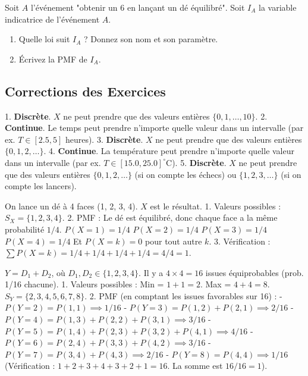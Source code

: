 \begin{exercicebox}
Soit $A$ l'événement "obtenir un 6 en lançant un dé équilibré".
Soit $I_A$ la variable indicatrice de l'événement $A$.
\begin{enumerate}
    \item Quelle loi suit $I_A$ ? Donnez son nom et son paramètre.
    \item Écrivez la PMF de $I_A$.
\end{enumerate}
\end{exercicebox}

\subsection{Corrections des Exercices}


\begin{correctionbox}
1.  \textbf{Discrète}. $X$ ne peut prendre que des valeurs entières $\{0, 1, \dots, 10\}$.
2.  \textbf{Continue}. Le temps peut prendre n'importe quelle valeur dans un intervalle (par ex. $T \in [2.5, 5]$ heures).
3.  \textbf{Discrète}. $X$ ne peut prendre que des valeurs entières $\{0, 1, 2, \dots\}$.
4.  \textbf{Continue}. La température peut prendre n'importe quelle valeur dans un intervalle (par ex. $T \in [15.0, 25.0]^\circ\text{C}$).
5.  \textbf{Discrète}. $X$ ne peut prendre que des valeurs entières $\{0, 1, 2, \dots\}$ (si on compte les échecs) ou $\{1, 2, 3, \dots\}$ (si on compte les lancers).
\end{correctionbox}

\begin{correctionbox}
On lance un dé à 4 faces (1, 2, 3, 4). $X$ est le résultat.
1.  Valeurs possibles : $S_X = \{1, 2, 3, 4\}$.
2.  PMF : Le dé est équilibré, donc chaque face a la même probabilité $1/4$.
    $P(X=1) = 1/4$
    $P(X=2) = 1/4$
    $P(X=3) = 1/4$
    $P(X=4) = 1/4$
    Et $P(X=k) = 0$ pour tout autre $k$.
3.  Vérification : $\sum P(X=k) = 1/4 + 1/4 + 1/4 + 1/4 = 4/4 = 1$.
\end{correctionbox}

\begin{correctionbox}
$Y = D_1 + D_2$, où $D_1, D_2 \in \{1, 2, 3, 4\}$. Il y a $4 \times 4 = 16$ issues équiprobables (prob. 1/16 chacune).
1.  Valeurs possibles : Min = $1+1=2$. Max = $4+4=8$. $S_Y = \{2, 3, 4, 5, 6, 7, 8\}$.
2.  PMF (en comptant les issues favorables sur 16) :
    - $P(Y=2) = P(1,1) \implies 1/16$
    - $P(Y=3) = P(1,2) + P(2,1) \implies 2/16$
    - $P(Y=4) = P(1,3) + P(2,2) + P(3,1) \implies 3/16$
    - $P(Y=5) = P(1,4) + P(2,3) + P(3,2) + P(4,1) \implies 4/16$
    - $P(Y=6) = P(2,4) + P(3,3) + P(4,2) \implies 3/16$
    - $P(Y=7) = P(3,4) + P(4,3) \implies 2/16$
    - $P(Y=8) = P(4,4) \implies 1/16$
    (Vérification : $1+2+3+4+3+2+1 = 16$. La somme est $16/16 = 1$).
\end{correctionbox}

